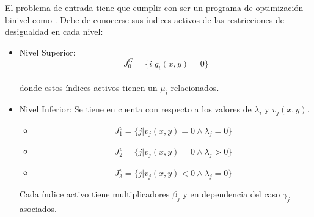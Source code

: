 \begin{samepage}
El problema de entrada tiene que cumplir con ser un programa de optimización binivel como . 
Debe de conocerse sus índices activos de las restricciones de desigualdad en cada nivel:
\begin{itemize}
    \item Nivel Superior:
            \begin{equation}
             J_0^G=\{i | g_i(x,y)=0\}
            \label{J_0_level_superior} %
            \end{equation}\\
    donde estos índices activos tienen un $\mu_i$ relacionados.
        
    \item Nivel Inferior:
                Se tiene en cuenta con respecto a los valores de $\lambda_i$ y $v_j(x,y)$.
                
                \begin{itemize}
                    \item \begin{equation}
                        J_1^v=\{j | v_j(x,y)=0 \land \lambda_j=0 \} %
                        \label{J_0_lambda_0_level_inferior}
                        \end{equation} 
                    \item \begin{equation}
                        J_2^v=\{j | v_j(x,y)=0 \land \lambda_j>0 \}
                        \label{J_0_lambda_pos_level_inferior}
                    \end{equation}
                    \item \begin{equation}
                        J_3^v=\{j | v_j(x,y)< 0 \land \lambda_j=0 \}
                        \label{J_neg_lambda_0_level_inferior}
                    \end{equation}
                \end{itemize}
    Cada índice activo tiene multiplicadores $\beta_j$ y en dependencia del caso $\gamma_j$ asociados.
\end{itemize}
\end{samepage}

